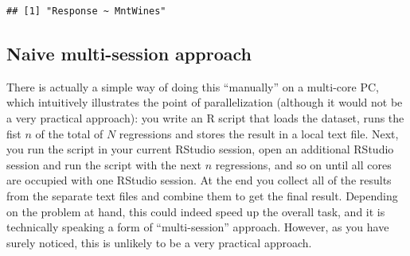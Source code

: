 \documentclass[
  12pt,
]{style/krantz}
\newenvironment{Shaded}{\begin{snugshade}}{\end{snugshade}}
\newcommand{\AttributeTok}[1]{\textcolor[rgb]{0.77,0.63,0.00}{#1}}
\newcommand{\CommentTok}[1]{\textcolor[rgb]{0.56,0.35,0.01}{\textit{#1}}}
\newcommand{\ControlFlowTok}[1]{\textcolor[rgb]{0.13,0.29,0.53}{\textbf{#1}}}
\newcommand{\DecValTok}[1]{\textcolor[rgb]{0.00,0.00,0.81}{#1}}
\newcommand{\FunctionTok}[1]{\textcolor[rgb]{0.00,0.00,0.00}{#1}}
\newcommand{\NormalTok}[1]{#1}
\newcommand{\OtherTok}[1]{\textcolor[rgb]{0.56,0.35,0.01}{#1}}
\newcommand{\SpecialCharTok}[1]{\textcolor[rgb]{0.00,0.00,0.00}{#1}}
\begin{document}
\begin{Shaded}
\end{Shaded}

\begin{verbatim}
## [1] "Response ~ MntWines"
\end{verbatim}

\hypertarget{naive-multi-session-approach}{%
\subsection{Naive multi-session approach}\label{naive-multi-session-approach}}

There is actually a simple way of doing this ``manually'' on a multi-core PC, which intuitively illustrates the point of parallelization (although it would not be a very practical approach): you write an R script that loads the dataset, runs the fist \(n\) of the total of \(N\) regressions and stores the result in a local text file. Next, you run the script in your current RStudio session, open an additional RStudio session and run the script with the next \(n\) regressions, and so on until all cores are occupied with one RStudio session. At the end you collect all of the results from the separate text files and combine them to get the final result. Depending on the problem at hand, this could indeed speed up the overall task, and it is technically speaking a form of ``multi-session'' approach. However, as you have surely noticed, this is unlikely to be a very practical approach.
\end{document}
